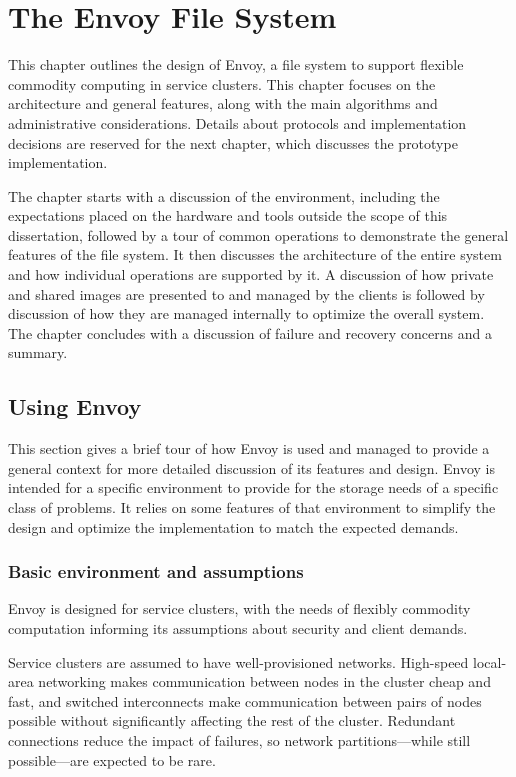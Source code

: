 \chapter{The Envoy File System}

This chapter outlines the design of Envoy, a file system to support flexible commodity computing in service clusters. This chapter focuses on the architecture and general features, along with the main algorithms and administrative considerations. Details about protocols and implementation decisions are reserved for the next chapter, which discusses the prototype implementation.

The chapter starts with a discussion of the environment, including the expectations placed on the hardware and tools outside the scope of this dissertation, followed by a tour of common operations to demonstrate the general features of the file system. It then discusses the architecture of the entire system and how individual operations are supported by it. A discussion of how private and shared images are presented to and managed by the clients is followed by discussion of how they are managed internally to optimize the overall system. The chapter concludes with a discussion of failure and recovery concerns and a summary.

\section{Using Envoy}

This section gives a brief tour of how Envoy is used and managed to provide a general context for more detailed discussion of its features and design. Envoy is intended for a specific environment to provide for the storage needs of a specific class of problems. It relies on some features of that environment to simplify the design and optimize the implementation to match the expected demands.

\subsection{Basic environment and assumptions}

Envoy is designed for service clusters, with the needs of flexibly commodity computation informing its assumptions about security and client demands.

Service clusters are assumed to have well-provisioned networks. High-speed local-area networking makes communication between nodes in the cluster cheap and fast, and switched interconnects make communication between pairs of nodes possible without significantly affecting the rest of the cluster. Redundant connections reduce the impact of failures, so network partitions---while still possible---are expected to be rare.

